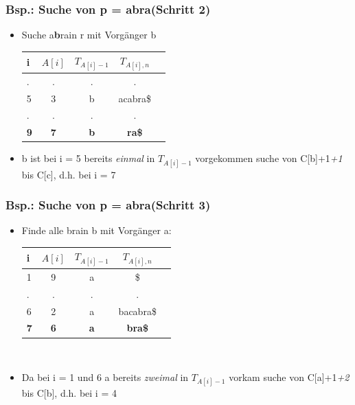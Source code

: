 \documentclass{beamer}
\begin{document}
\begin{frame}
\frametitle{Bsp.: Suche von p = \glqq abra\grqq (Schritt 2)}
\begin{itemize}
\item Suche \glqq a\color{red}\textbf{b}\color{black}ra\grqq in r mit Vorgänger b
\begin{tabular}{l<{\ttfamily}|c<{\ttfamily} c<{\ttfamily}c<{\ttfamily} r<{\ttfamily}}
\textbf{i} & $A[i]$ & $T_{A[i]-1}$ & $T_{A[i],n}$\\\hline
. & . & . & .\\
5 & 3 & b & acabra\$ \\
. & . & . & .\\
\textbf{9} & \textbf{7} & \color{red}\textbf{b} & \textbf{ra\$} \\
\end{tabular}
\item b ist bei i = 5 bereits \textit{einmal} in $T_{A[i]-1}$ vorgekommen \textrightarrow suche von C[\glqq b\grqq]+1\textit{+1} bis C[\glqq c\grqq], d.h. bei i = 7
\end{itemize}
\end{frame}
\begin{frame}
\frametitle{Bsp.: Suche von p = \glqq abra\grqq (Schritt 3)}
\begin{itemize}
\item Finde alle bra\grqq  in b mit Vorgänger \glqq a\grqq:\\[5mm]
\begin{tabular}{l<{\ttfamily}|c<{\ttfamily} c<{\ttfamily}c<{\ttfamily} r<{\ttfamily}}
\textbf{i} & $A[i]$ & $T_{A[i]-1}$ & $T_{A[i],n}$\\\hline
1 & 9 & a & \$ \\
. & . & . & .\\
6 & 2 & a & bacabra\$ \\
\textbf{7} & \textbf{6}  & \color{red}\textbf{a} & \textbf{bra\$} \\
\end{tabular}\\[5mm]
\item Da bei i = 1 und 6 a bereits \textit{zweimal} in $T_{A[i]-1}$ vorkam \textrightarrow suche von C[\glqq a\grqq]+1\textit{+2} bis C[\glqq b\grqq], d.h. bei i = 4
\end{itemize}
\end{frame}
\end{document}
